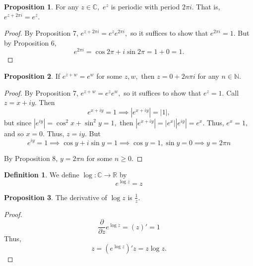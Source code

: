 \documentclass[10pt, oneside]{article}
\newcommand{\bbR}{\mathbb{R}}
\newcommand{\bbC}{\mathbb{C}}
\newcommand{\bbN}{\mathbb{N}}
\theoremstyle{definition}
\newtheorem{defn}{Definition}
\newtheorem{prop}{Proposition}
\newcommand{\bbC}{\mathbb{C}}
\newcommand{\bbN}{\mathbb{N}}
\newcommand{\bbR}{\mathbb{R}}
\begin{document}
\begin{prop}
    For any $z\in \bbC,$ $e^z$ is periodic with period $2\pi i.$ That is, $e^{z + 2\pi i}=  e^z.$
\end{prop}
\begin{proof}
    By Proposition 7, $e^{z + 2\pi i} = e^z e^{2\pi i},$ so it suffices to show that $e^{2\pi i}  = 1.$ But by Proposition 6,
    \[e^{2\pi i} = \cos {2\pi} + i\sin{2\pi} = 1 + 0 = 1.\]
\end{proof}

\begin{prop}
    If $e^{z + w} = e^w$ for some $z,w,$ then $z = 0 + 2n\pi i$ for any $n \in \bbN.$ 
\end{prop}
\begin{proof}
    By Proposition 7, $e^{z + w} = e^ze^w,$ so it suffices to show that $e^z  = 1.$ Call $z = x + i y.$ Then 
    \[e^{x+ iy} = 1 \implies |e^{x + iy}| = |1|,\] but since $|e^{iy}| = \cos^2 x + \sin^2 y =  1,$ then 
    $|e^{x + iy}| = |e^x||e^{iy}| = e^x.$ Thus, $e^x = 1,$ and so $x = 0.$ Thus, $z = iy.$ But 
    \[e^{iy} = 1 \implies \cos y + i\sin y = 1 \implies \cos y = 1, \sin y = 0 \implies y = 2\pi n\]
    
    By Proposition 8, $y = 2\pi n$ for some $n \geq 0.$ 
\end{proof}
\begin{defn}
    We define $\log: \bbC \to \bbR$ by 
    \[e^{\log z} = z\]
\end{defn}
\begin{prop}
    The derivative of $\log z$ is $\frac{1}{z}.$
\end{prop}
\begin{proof}
    \[\frac{\partial}{\partial z} e^{\log z} = (z)' = 1\] Thus, 
    \[z = (e^{\log z})' z = z\log z .\]
\end{proof}
\end{document}
